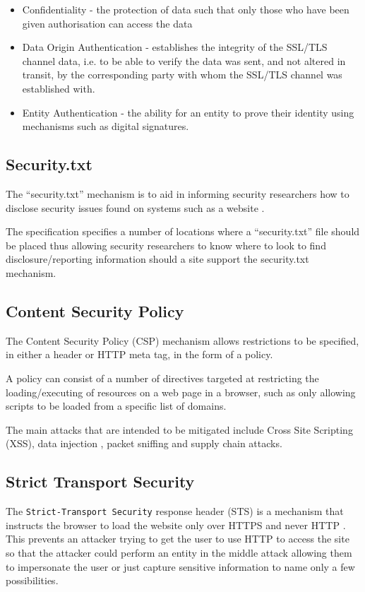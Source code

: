 \documentclass{mscreport}
\begin{document}
\begin{itemize}
	\setlength\itemsep{0.1em}
	\item Confidentiality - the protection of data such that only those who have been given authorisation can access the data
	\item Data Origin Authentication - establishes the integrity of the SSL/TLS channel data, i.e. to be able to verify the data was sent, and not altered in transit, by the corresponding party with whom the SSL/TLS channel was established with.
	\item Entity Authentication - the ability for an entity to prove their identity using mechanisms such as digital signatures.

\end{itemize}


\subsection{Security.txt}
The ``security.txt'' mechanism is to aid in informing security researchers how to disclose security issues found on systems such as a website \cite{Foudil2021-vh}.

\vspace{0.3cm} \noindent
The specification specifies a number of locations where a ``security.txt'' file should be placed thus allowing security researchers to know where to look to find disclosure/reporting information should a site support the security.txt mechanism.



\subsection{Content Security Policy}
The Content Security Policy (CSP) mechanism allows restrictions to be specified, in either a header or HTTP meta tag, in the form of a policy.

\vspace{0.3cm} \noindent
A policy can consist of a number of directives targeted at restricting the loading/executing of resources on a web page in a browser, such as only allowing scripts to be loaded from a specific list of domains.

\vspace{0.3cm} \noindent
The main attacks that are intended to be mitigated include Cross Site Scripting (XSS), data injection , packet sniffing and supply chain attacks.


\subsection{Strict Transport Security}
The \texttt{Strict-Transport Security} response header (STS) is a mechanism that instructs the browser to load the website only over HTTPS and never HTTP \cite{Hodges2012-pe}. This prevents an attacker trying to get the user to use HTTP to access the site so that the attacker could perform an entity in the middle attack allowing them to impersonate the user or just capture sensitive information to name only a few possibilities.
\end{document}
